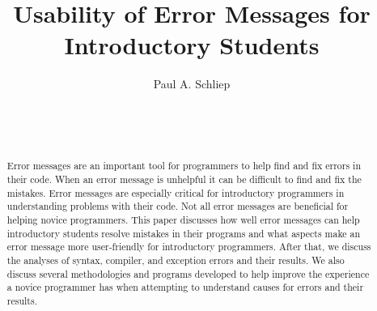 \documentclass{sig-alternate}
\begin{document}

\title{Usability of Error Messages for Introductory Students}


\author{
\alignauthor
Paul A. Schliep\\
	\\
	\\
	\\
}

\maketitle
\begin{abstract}
Error messages are an important tool for programmers to help find and fix errors in their code.
When an error message is unhelpful it can be difficult to find and fix the mistakes.
Error messages are especially critical for introductory programmers in understanding problems with their code.
Not all error messages are beneficial for helping novice programmers.
This paper discusses how well error messages can help introductory students resolve mistakes in their programs and what aspects make an error message more user-friendly for introductory programmers.
After that, we discuss the analyses of syntax, compiler, and exception errors and their results.
We also discuss several methodologies and programs developed to help improve the experience a novice programmer has when attempting to understand causes for errors and their results.

\end{abstract}

\end{document}
